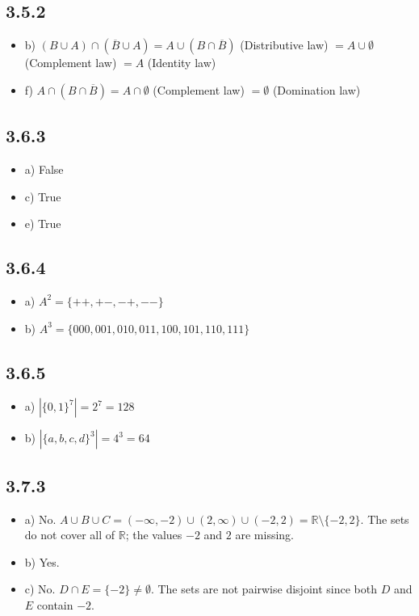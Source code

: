 \documentclass{article}
\begin{document}
\subsection*{3.5.2}
\begin{itemize}
    \item b) $(B \cup A) \cap (\overline{B} \cup A) = A \cup (B \cap \overline{B})$ (Distributive law) $= A \cup \emptyset$ (Complement law) $= A$ (Identity law)
    \item f) $A \cap (B \cap \overline{B}) = A \cap \emptyset$ (Complement law) $= \emptyset$ (Domination law)
\end{itemize}

\subsection*{3.6.3}
\begin{itemize}
    \item a) False
    \item c) True
    \item e) True
\end{itemize}

\subsection*{3.6.4}
\begin{itemize}
    \item a) $A^2 = \{++, +-, -+, --\}$
    \item b) $A^3 = \{000, 001, 010, 011, 100, 101, 110, 111\}$
\end{itemize}

\subsection*{3.6.5}
\begin{itemize}
    \item a) $|\{0,1\}^7| = 2^7 = 128$
    \item b) $|\{a,b,c,d\}^3| = 4^3 = 64$
\end{itemize}

\subsection*{3.7.3}
\begin{itemize}
    \item a) No. $A \cup B \cup C = (-\infty, -2) \cup (2, \infty) \cup (-2, 2) = \mathbb{R} \setminus \{-2, 2\}$. The sets do not cover all of $\mathbb{R}$; the values $-2$ and $2$ are missing.
    \item b) Yes.
    \item c) No. $D \cap E = \{-2\} \neq \emptyset$. The sets are not pairwise disjoint since both $D$ and $E$ contain $-2$.
\end{itemize}
\end{document}
